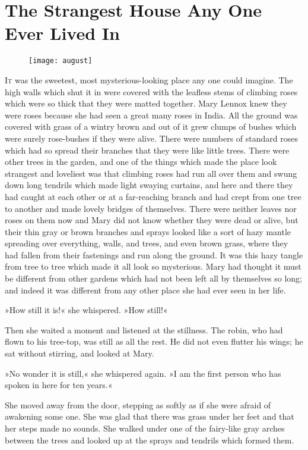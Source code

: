 \chapter{The Strangest House Any One Ever Lived In} 
\begin{figure}[t!]
\centering
\texttt{[image: august]}
\end{figure}
 \lettrine[lines=6]{I}{t} was the sweetest, most mysterious-looking place any one could imagine. The high walls which shut it in were covered with the leafless stems of climbing roses which were so thick that they were matted together. Mary Lennox knew they were roses because she had seen a great many roses in India. All the ground was covered with grass of a wintry brown and out of it grew clumps of bushes which were surely rose-bushes if they were alive. There were numbers of standard roses which had so spread their branches that they were like little trees. There were other trees in the garden, and one of the things which made the place look strangest and loveliest was that climbing roses had run all over them and swung down long tendrils which made light swaying curtains, and here and there they had caught at each other or at a far-reaching branch and had crept from one tree to another and made lovely bridges of themselves. There were neither leaves nor roses on them now and Mary did not know whether they were dead or alive, but their thin gray or brown branches and sprays looked like a sort of hazy mantle spreading over everything, walls, and trees, and even brown grass, where they had fallen from their fastenings and run along the ground. It was this hazy tangle from tree to tree which made it all look so mysterious. Mary had thought it must be different from other gardens which had not been left all by themselves so long; and indeed it was different from any other place she had ever seen in her life.

»How still it is!« she whispered. »How still!«

Then she waited a moment and listened at the stillness. The robin, who had flown to his tree-top, was still as all the rest. He did not even flutter his wings; he sat without stirring, and looked at Mary.

»No wonder it is still,« she whispered again. »I am the first person who has spoken in here for ten years.«

She moved away from the door, stepping as softly as if she were afraid of awakening some one. She was glad that there was grass under her feet and that her steps made no sounds. She walked under one of the fairy-like gray arches between the trees and looked up at the sprays and tendrils which formed them.

